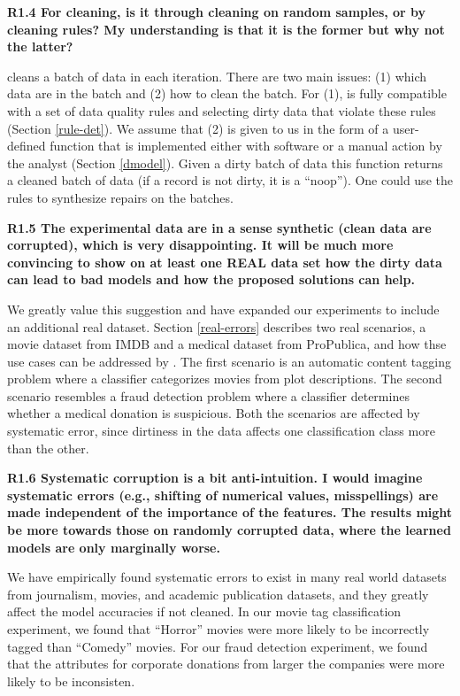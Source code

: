 \vspace{0.5em}

\noindent\textbf{R1.4 For cleaning, is it through cleaning on random samples, or by cleaning rules? My understanding is that it is the former but why not the latter?}

\noindent \sys cleans a batch of data in each iteration. 
There are two main issues: (1) which data are in the batch and (2) how to clean the batch. 
For (1), \sys is fully compatible with a set of data quality rules and selecting dirty data that violate these rules (Section \ref{rule-det}).
We assume that (2) is given to us in the form of a user-defined function that is implemented either with software or a manual action by the analyst (Section \ref{dmodel}). 
Given a dirty batch of data this function returns a cleaned batch of data (if a record is not dirty, it is a ``noop'').
One could use the rules to synthesize repairs on the batches.

\vspace{0.5em}

\noindent\textbf{R1.5 The experimental data are in a sense synthetic (clean data are corrupted), which is very disappointing. It will be much more convincing to show on at least one REAL data set how the dirty data can lead to bad models and how the proposed solutions can help.}

\noindent We greatly value this suggestion and have expanded our experiments to include an additional real dataset.
Section \ref{real-errors} describes two real scenarios, a movie dataset from IMDB and a medical dataset from ProPublica, and how thse use cases can be addressed by \sys.
The first scenario is an automatic content tagging problem where a classifier categorizes movies from plot descriptions.
The second scenario resembles a fraud detection problem where a classifier determines whether a medical donation is suspicious.
Both the scenarios are affected by systematic error, since dirtiness in the data affects one classification class more than the other.

\vspace{0.5em}

\noindent\textbf{R1.6 Systematic corruption is a bit anti-intuition. I would imagine systematic errors (e.g., shifting of numerical values, misspellings) are made independent of the importance of the features. The results might be more towards those on randomly corrupted data, where the learned models are only marginally worse.}

\noindent  We have empirically found systematic errors to exist in many real world datasets from journalism, movies, and academic publication datasets, and they greatly affect the model accuracies if not cleaned. In our movie tag classification experiment, we found that ``Horror'' movies were more likely to be incorrectly tagged than ``Comedy'' movies.
For our fraud detection experiment, we found that the attributes for corporate donations from larger the companies were more likely to be inconsisten.

